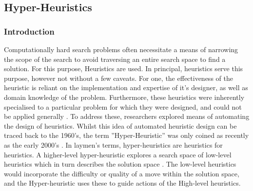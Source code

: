 \documentclass[a4paper,12pt]{article}
\begin{document}
    \subsection{Hyper-Heuristics}
        \subsubsection{Introduction}
            \par{
                \noindent
                Computationally hard search problems often necessitate a means of narrowing
                the scope of the search to avoid traversing an entire search space to find a solution. 
                For this purpose, Heuristics are used. In principal, heuristics serve this
                purpose, however not without a few caveats. For one, the effectiveness of the
                heuristic is reliant on the implementation and expertise of it’s designer, as well
                as domain knowledge of the problem. Furthermore, these heuristics were inherently 
                specialised to a particular problem for which they were designed, and
                could not be applied generally \cite{hyperheuristictas}. To address these, researchers explored
                means of automating the design of heuristics. Whilst this idea of automated
                heuristic design can be traced back to the 1960’s, the term ”Hyper-Heuristic”
                was only coined as recently as the early 2000’s \cite{hyperheuristic2000}. In laymen’s terms,
                hyper-heuristics are heuristics for heuristics. A higher-level hyper-heuristic explores a search space 
                of low-level heuristics which in turn describes the solution space \cite{hhcds}. The low-level 
                heuristics would incorporate the difficulty or quality of a move within the solution space, and 
                the Hyper-heuristic uses these to guide actions of the High-level heuristics.
            }
\end{document}
